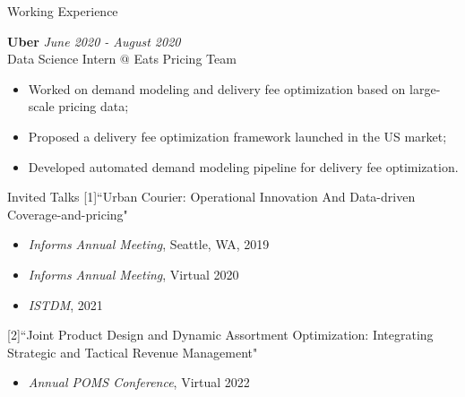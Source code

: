 \documentclass{resume} %
\begin{document}

\begin{rSection}{Working Experience}

{\bf Uber} \hfill {\em June 2020 - August 2020}
\\Data Science Intern $@$ Eats Pricing Team
\begin{itemize}
	\item Worked on demand modeling and delivery fee optimization based on large-scale pricing data;
	\item Proposed a delivery fee optimization framework launched in the US market;
	\item Developed automated demand modeling pipeline for delivery fee optimization.
\end{itemize}
\end{rSection}



\begin{rSection}{Invited Talks} 
[1]``Urban Courier: Operational Innovation And Data-driven Coverage-and-pricing" 
\begin{itemize}
	\item \textit{Informs Annual Meeting}, Seattle, WA, 2019
	\item \textit{Informs Annual Meeting}, Virtual 2020
	\item \textit{ISTDM}, 2021
\end{itemize}
[2]``Joint Product Design and Dynamic Assortment Optimization: Integrating Strategic and Tactical Revenue Management" 
\begin{itemize}
	\item \textit{Annual POMS Conference}, Virtual 2022
\end{itemize}
\end{rSection}
\end{document}

